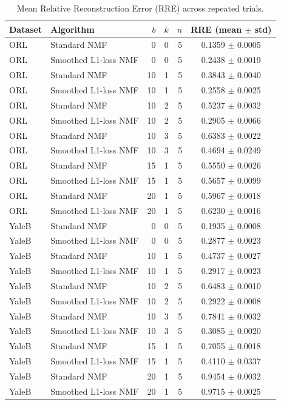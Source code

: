 \begin{table}[t]
\centering
\caption{Mean Relative Reconstruction Error (RRE) across repeated trials.}
\label{tab:rre-summary}
\begin{tabular}{llrrrc}
\toprule
Dataset & Algorithm & $b$ & $k$ & $n$ & RRE (mean $\pm$ std) \\
\midrule
ORL & Standard NMF & 0 & 0 & 5 & 0.1359 $\pm$ 0.0005 \\
ORL & Smoothed L1-loss NMF & 0 & 0 & 5 & 0.2438 $\pm$ 0.0019 \\
ORL & Standard NMF & 10 & 1 & 5 & 0.3843 $\pm$ 0.0040 \\
ORL & Smoothed L1-loss NMF & 10 & 1 & 5 & 0.2558 $\pm$ 0.0025 \\
ORL & Standard NMF & 10 & 2 & 5 & 0.5237 $\pm$ 0.0032 \\
ORL & Smoothed L1-loss NMF & 10 & 2 & 5 & 0.2905 $\pm$ 0.0066 \\
ORL & Standard NMF & 10 & 3 & 5 & 0.6383 $\pm$ 0.0022 \\
ORL & Smoothed L1-loss NMF & 10 & 3 & 5 & 0.4694 $\pm$ 0.0249 \\
ORL & Standard NMF & 15 & 1 & 5 & 0.5550 $\pm$ 0.0026 \\
ORL & Smoothed L1-loss NMF & 15 & 1 & 5 & 0.5657 $\pm$ 0.0099 \\
ORL & Standard NMF & 20 & 1 & 5 & 0.5967 $\pm$ 0.0018 \\
ORL & Smoothed L1-loss NMF & 20 & 1 & 5 & 0.6230 $\pm$ 0.0016 \\
YaleB & Standard NMF & 0 & 0 & 5 & 0.1935 $\pm$ 0.0008 \\
YaleB & Smoothed L1-loss NMF & 0 & 0 & 5 & 0.2877 $\pm$ 0.0023 \\
YaleB & Standard NMF & 10 & 1 & 5 & 0.4737 $\pm$ 0.0027 \\
YaleB & Smoothed L1-loss NMF & 10 & 1 & 5 & 0.2917 $\pm$ 0.0023 \\
YaleB & Standard NMF & 10 & 2 & 5 & 0.6483 $\pm$ 0.0010 \\
YaleB & Smoothed L1-loss NMF & 10 & 2 & 5 & 0.2922 $\pm$ 0.0008 \\
YaleB & Standard NMF & 10 & 3 & 5 & 0.7841 $\pm$ 0.0032 \\
YaleB & Smoothed L1-loss NMF & 10 & 3 & 5 & 0.3085 $\pm$ 0.0020 \\
YaleB & Standard NMF & 15 & 1 & 5 & 0.7055 $\pm$ 0.0018 \\
YaleB & Smoothed L1-loss NMF & 15 & 1 & 5 & 0.4110 $\pm$ 0.0337 \\
YaleB & Standard NMF & 20 & 1 & 5 & 0.9454 $\pm$ 0.0032 \\
YaleB & Smoothed L1-loss NMF & 20 & 1 & 5 & 0.9715 $\pm$ 0.0025 \\
\bottomrule
\end{tabular}
\end{table}
